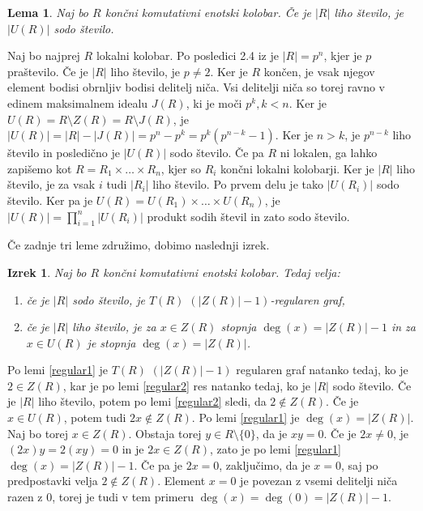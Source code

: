 \documentclass[a4paper, 12pt]{amsart}
\theoremstyle{definition} %
\theoremstyle{plain} %
\newtheorem{lema}[definicija]{Lema}
\newtheorem{izrek}[definicija]{Izrek}
\begin{document}
\begin{lema}
\label{regular3}
Naj bo $R$ končni komutativni enotski kolobar. Če je $|R|$ liho število, je $|U(R)|$ sodo število.
\end{lema}

\proof
Naj bo najprej $R$ lokalni kolobar. Po posledici 2.4 iz \cite{diploma} je $|R| = p^n$, kjer je $p$ praštevilo. Če je $|R|$ liho število, je $p\neq 2$. Ker je $R$ končen, je vsak njegov element bodisi obrnljiv bodisi delitelj niča. Vsi delitelji niča so torej ravno v edinem maksimalnem idealu $J(R)$, ki je moči $p^k, k < n$. Ker je $U(R) = R \setminus Z(R) = R \setminus J(R)$, je $|U(R)| = |R| - |J(R) | = p^n - p ^k = p^k(p^{n-k} -1)$. Ker je $n>k$, je $p^{n-k}$ liho število in posledično je $|U(R)|$ sodo število. Če pa $R$ ni lokalen, ga lahko zapišemo kot $R= R_1 \times \dots \times R_n$, kjer so $R_i$ končni lokalni kolobarji. Ker je $|R|$ liho število, je za vsak $i$ tudi $|R_i|$ liho število. Po prvem delu je tako $|U(R_i)| $ sodo število. Ker pa je $U(R) = U(R_1) \times \dots \times U(R_n)$, je $|U(R)| = \prod_{i=1}^n |U(R_i)|$ produkt sodih števil in zato sodo število.
\endproof

Če zadnje tri leme združimo, dobimo naslednji izrek.

\begin{izrek}
\label{regularnostT(R)}
Naj bo $R$ končni komutativni enotski  kolobar. Tedaj velja:
 \begin{enumerate}
\item če je $|R|$ sodo število, je $T(R)$ $(|Z(R)| -1)$-regularen graf,
\item če je $|R|$ liho število, je za $x\in Z(R)$ stopnja $\deg(x) = |Z(R)| - 1$ in za $x\in U(R)$ je stopnja $\deg(x) = |Z(R)|$.
\end{enumerate}
\end{izrek}

\proof
Po lemi \ref{regular1} je $T(R)$ $(|Z(R)| -1)$ regularen graf natanko tedaj, ko je $2\in Z(R)$, kar je po lemi \ref{regular2}  res natanko tedaj, ko je $|R|$ sodo število. Če je $|R|$ liho število, potem po lemi \ref{regular2} sledi, da $2\notin Z(R)$. Če je $x \in U(R)$, potem tudi $2x\notin Z(R)$. Po lemi \ref{regular1} je $\deg(x) = |Z(R)|$. Naj bo torej $x\in Z(R)$. Obstaja torej $y\in R \setminus \{0\}$, da je $xy=0$. Če je $2x \neq 0$, je $(2x) y = 2(xy) = 0$ in je $2x\in Z(R)$,  zato je po lemi \ref{regular1} $\deg(x) = |Z(R)|-1$. Če pa je $2x = 0$, zaključimo, da je $x=0$, saj po predpostavki velja $2\notin Z(R)$. Element $x=0$ je povezan z vsemi delitelji niča razen z 0, torej je tudi v tem primeru $\deg(x) = \deg(0) = |Z(R)| - 1$.
\endproof
\end{document}
